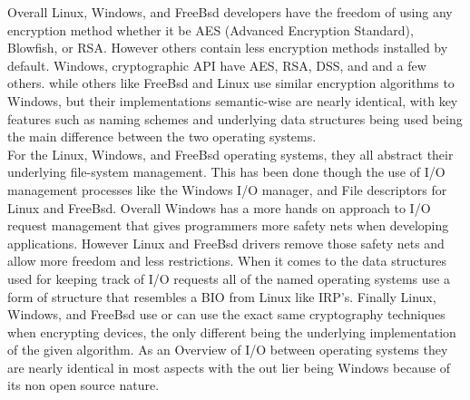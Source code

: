 \documentclass[letterpaper,10pt,titlepage]{IEEEtran}
\begin{document}
Overall Linux, Windows, and FreeBsd developers have the freedom of using any encryption method whether it be AES (Advanced Encryption Standard), Blowfish, or RSA. However others contain less encryption methods installed by default. Windows, cryptographic API have AES, RSA, DSS, and and a few others\cite{Cryptogr64:online}. while others like FreeBsd and Linux use similar encryption algorithms to Windows, but their implementations semantic-wise are nearly identical, with key features such as naming schemes and underlying data structures being used being the main difference between the two operating systems.\\

For the Linux, Windows, and FreeBsd operating systems, they all abstract their underlying file-system management. This has been done though the use of I/O management processes like the Windows I/O manager, and File descriptors for Linux and FreeBsd. Overall Windows has a more hands on approach to I/O request management that gives programmers more safety nets when developing applications. However Linux and FreeBsd drivers remove those safety nets and allow more freedom and less restrictions. When it comes to the data structures used for keeping track of I/O requests all of the named operating systems use a form of structure that resembles a BIO from Linux like IRP's. Finally Linux, Windows, and FreeBsd use or can use the exact same cryptography techniques when encrypting devices, the only different being the underlying implementation of the given algorithm. As an Overview of I/O between operating systems  they are nearly identical in most aspects with the out lier being Windows because of its non open source nature.  
  
\nocite{*}%


\end{document}
